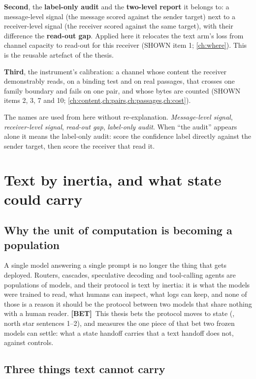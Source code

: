 \documentclass[11pt,a4paper]{report}
\newcommand{\BET}{\textcolor{betc}{\textbf{\scriptsize[BET]}}}
\begin{document}
\textbf{Second}, the \textbf{label-only audit} and the \textbf{two-level report} it belongs to: a message-level signal (the message scored against the sender target) next to a receiver-level signal (the receiver scored against the same target), with their difference the \textbf{read-out gap}. Applied here it relocates the text arm's loss from channel capacity to read-out for this receiver (SHOWN item 1; \cref{ch:where}). This is the reusable artefact of the thesis.

\textbf{Third}, the instrument's calibration: a channel whose content the receiver demonstrably reads, on a binding test and on real passages, that crosses one family boundary and fails on one pair, and whose bytes are counted (SHOWN items 2, 3, 7 and 10; \cref{ch:content,ch:pairs,ch:passages,ch:cost}).

The names are used from here without re-explanation. \emph{Message-level signal}, \emph{receiver-level signal}, \emph{read-out gap}, \emph{label-only audit}. When ``the audit'' appears alone it means the label-only audit: score the confidence label directly against the sender target, then score the receiver that read it.

\chapter{Text by inertia, and what state could carry}
\label{ch:state}

\section{Why the unit of computation is becoming a population}

A single model answering a single prompt is no longer the thing that gets deployed. Routers, cascades, speculative decoding and tool-calling agents are populations of models, and their protocol is text by inertia: it is what the models were trained to read, what humans can inspect, what logs can keep, and none of those is a reason it should be the protocol between two models that share nothing with a human reader. \BET\ This thesis bets the protocol moves to state (, north star sentences 1--2), and measures the one piece of that bet two frozen models can settle: what a state handoff carries that a text handoff does not, against controls.

\section{Three things text cannot carry}
\end{document}
